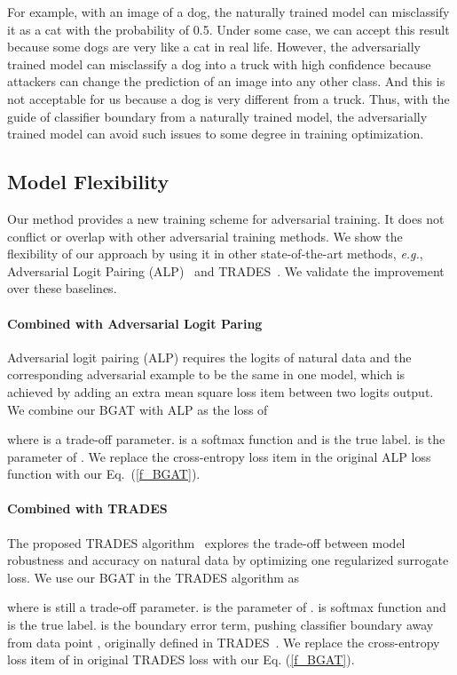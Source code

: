 \documentclass[10pt,twocolumn,letterpaper]{article}
\begin{document}
For example, with an image of a dog, the naturally trained model can misclassify it as a cat with the probability of 0.5. Under some case, we can accept this result because
some dogs are very like a cat in real life. However, the adversarially trained model can misclassify a dog into a truck with high confidence because attackers can change the prediction of an image into any other class. And this is not acceptable for us because a dog is very different from
a truck. Thus, with the guide of classifier boundary from a naturally trained model, the adversarially trained model can avoid such issues to some degree in training optimization.

\subsection{Model Flexibility}
Our method provides a new training scheme for adversarial training. It does not conflict or overlap with other adversarial training methods. We show the flexibility of our approach by using it in other state-of-the-art methods, {\it e.g.}, Adversarial Logit Pairing (ALP)~\cite{DBLP:journals/corr/abs-1803-06373} and TRADES~\cite{zhang2019theoretically}. We validate the improvement over these baselines.

\paragraph{Combined with Adversarial Logit Paring}
Adversarial logit pairing (ALP) requires the logits of natural data  and the corresponding adversarial example  to be the same in one model, which is achieved by adding an extra mean square loss item between two logits output. We combine our BGAT with ALP as the loss of
\begin{small}
	
\end{small}
where  is a trade-off parameter.  is a softmax function and  is the true label.  is the parameter of . We replace the cross-entropy loss item  in the original ALP loss function with our Eq.~(\ref{f_BGAT}).

\paragraph{Combined with TRADES}
The proposed TRADES algorithm~\cite{zhang2019theoretically} explores the trade-off between model robustness and accuracy on natural data by optimizing one regularized surrogate loss. We use our BGAT in the TRADES algorithm as
\begin{small}
	
\end{small}
where  is still a trade-off parameter.   is the parameter of .  is softmax function and  is the true label.  is the boundary error term, pushing classifier boundary away from data point , originally defined in TRADES~\cite{zhang2019theoretically}. We replace the cross-entropy loss item of   in original TRADES loss with our Eq. (\ref{f_BGAT}). 
\end{document}
